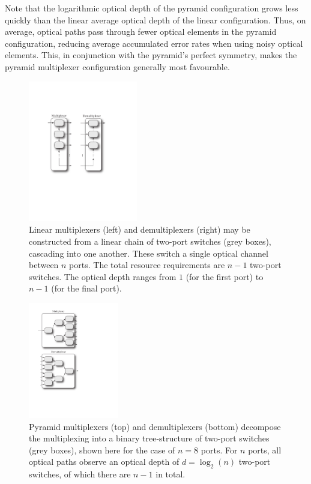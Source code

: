 Note that the logarithmic optical depth of the pyramid configuration grows less quickly than the linear average optical depth of the linear configuration. Thus, on average, optical paths pass through fewer optical elements in the pyramid configuration, reducing average accumulated error rates when using noisy optical elements. This, in conjunction with the pyramid's perfect symmetry, makes the pyramid multiplexer configuration generally most favourable.

\begin{figure}[!htbp]
\includegraphics[clip=true, width=0.425\textwidth]{linear_multiplexer}
\captionspacefig \caption{Linear multiplexers (left) and demultiplexers (right) may be constructed from a linear chain of two-port switches (grey boxes), cascading into one another. These switch a single optical channel between $n$ ports. The total resource requirements are \mbox{$n-1$} two-port switches. The optical depth ranges from $1$ (for the first port) to \mbox{$n-1$} (for the final port).} \label{fig:linear_multiplexer} 
\end{figure}

\begin{figure}[!htbp]
\includegraphics[clip=true, width=0.35\textwidth]{pyramid_multiplexer}
\captionspacefig \caption{Pyramid multiplexers (top) and demultiplexers (bottom) decompose the multiplexing into a binary tree-structure of two-port switches (grey boxes), shown here for the case of \mbox{$n=8$} ports. For $n$ ports, all optical paths observe an optical depth of \mbox{$d=\log_2(n)$} two-port switches, of which there are \mbox{$n-1$} in total.} \label{fig:pyramid_multiplexer} 
\end{figure}

